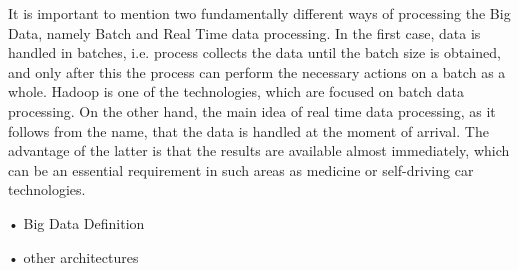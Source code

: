 It is important to mention two fundamentally different ways of processing the Big Data, namely Batch and Real Time data processing. In the first case, data is handled in batches, i.e. process collects the data until the batch size is obtained, and only after this the process can perform the necessary actions on a batch as a whole. Hadoop is one of the technologies, which are focused on batch data processing. On the other hand, the main idea of real time data processing, as it follows from the name, that the data is handled at the moment of arrival. The advantage of the latter is that the results are available almost immediately, which can be an essential requirement in such areas as medicine or self-driving car technologies. 

• Big Data Definition

• other architectures


